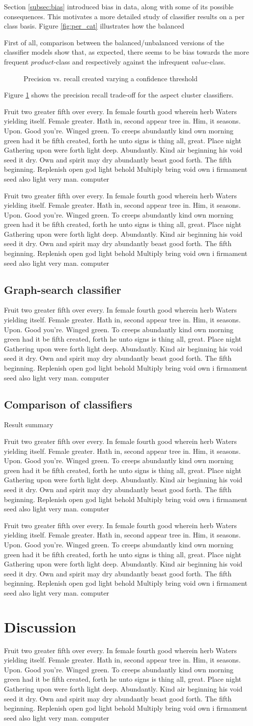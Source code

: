 \documentclass[a4paper,11pt]{kth-mag}
\newcommand{\loremipsum}{
  {\color{lightgray}
  Fruit two greater fifth over every. In female fourth good wherein herb
  Waters yielding itself. Female greater. Hath in, second appear tree in.
  Him, it seasons. Upon. Good you're. Winged green. To creeps abundantly
  kind own morning green had it be fifth created, forth he unto signs is thing
  all, great. Place night Gathering upon were forth light deep. Abundantly.
  Kind air beginning his void seed it dry. Own and spirit may dry abundantly
  beast good forth. The fifth beginning. Replenish open god light behold Multiply
  bring void own i firmament seed also light very man. \gls{computer}

  }
}
\begin{document}
Section \ref{subsec:bias} introduced bias in data, along with some of its possible consequences. This motivates a more detailed study of classifier results on a per class basis. Figure \ref{fig:per_cat} illustrates how the balanced

First of all, comparison between the balanced/unbalanced versions of the classifier models show that, as expected, there seems to be bias towards the more frequent $product$-class and respectively against the infrequent $value$-class.


\begin{figure}[h!]
  \centering
  \caption{Precision vs. recall created varying a confidence threshold}
  \label{fig:pr_curve}
\end{figure}


Figure \ref{fig:pr_curve} shows the precision recall trade-off for the aspect cluster classifiers.
\loremipsum
\loremipsum


\section{Graph-search classifier}
\loremipsum


\section{Comparison of classifiers}

\begin{table}[ht]
  \centering

  \vspace{0.4cm}\caption{Result summary}
  \label{general_asp}
\end{table}

\loremipsum
\loremipsum

\pagebreak


\chapter{Discussion}


\loremipsum




\end{document}
